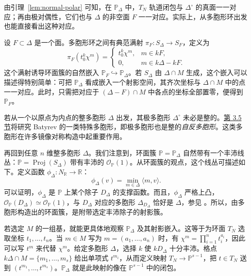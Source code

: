 由引理~\ref{lem:normal-polar} 可知，在 $\mathbb P_\Delta$ 中，$T_N$ 轨道闭包与 $\Delta^\circ$ 的真面一一对应；再由极对偶性，它们也与 $\Delta$ 的非空面 $F$ 一一对应。实际上，从多胞形环出发也能直接看出这种对应。

设 $F\subset\Delta$ 是一个面。多胞形环之间有典范满射 $\pi_F:S_\Delta\to S_F$，定义为
\[
\pi_F(t_0^k\chi^m)=
\begin{cases}
t_0^k\chi^m,&m\in kF,\\
0,&m\in k\Delta-kF.
\end{cases}
\]
这个满射诱导环面簇的自然嵌入 $\mathbb P_F\hookrightarrow\mathbb P_\Delta$。若 $S_\Delta$ 由 $\Delta\cap M$ 生成，这个嵌入可以描述得特别简单：可把 $\mathbb P_\Delta$ 看成嵌入一个射影空间，其齐次坐标与 $\Delta\cap M$ 中的点一一对应。此时，只需把对应于 $(\Delta-F)\cap M$ 中各点的坐标全部置零，便得到 $\mathbb P_F$。

若从一个以原点为内点的整多胞形 $\Delta$ 出发，其极多胞形 $\Delta^\circ$ 未必是整的。\hyperref[sec:fano-reflexive]{第 3.5 节}将研究 Batyrev 的一类特殊多胞形，即极多胞形也是整的\emph{自反多胞形}。这类多胞形在许多镜像对称构造中起重要作用。

再回到任意 $n$ 维整多胞形 $\Delta$。我们注意到，环面簇 $\mathbb P=\mathbb P_\Delta$ 自然带有一个丰沛线丛：$\mathbb P=\operatorname{Proj}(S_\Delta)$ 带有丰沛的 $\mathcal O_{\mathbb P}(1)$。从环面簇的观点，这个线丛可描述如下。定义函数 $\phi_\Delta:N_{\mathbb R}\to\mathbb R$：
\[
\phi_\Delta(v)=\min_{m\in\Delta}\langle m,v\rangle .
\]
可以证明，$\phi_\Delta$ 是 $\mathbb P$ 上某个除子 $D_\Delta$ 的支撑函数。而且，$\phi_\Delta$ 严格上凸，$\mathcal O_{\mathbb P}(D_\Delta)\simeq\mathcal O_{\mathbb P}(1)$，与 $D_\Delta$ 对应的多胞形 $\Delta_{D_\Delta}$ 恰好是 $\Delta$，参见 。所以，由多胞形构造出的环面簇，是附带选定丰沛除子的射影簇。

若选定 $M$ 的一组基，就能更具体地观察 $\mathbb P_\Delta$ 及其射影嵌入。这等于为环面 $T_N$ 选取坐标 $t_1,\ldots,t_n$。当 $m\in M$ 写为 $m=(a_1,\ldots,a_n)$ 时，有 $\chi^m=\prod_{i=1}^{n}t_i^{a_i}$，因此可以写 $t^m$ 来代替 $\chi^m$。给定多胞形 $\Delta$，选择 $k$ 使 $kD_\Delta$ 十分丰沛。格点 $k\Delta\cap M=\{m_1,\ldots,m_s\}$ 给出单项式 $t^{m_i}$，从而定义映射 $T_N\to\mathbb P^{s-1}$，把 $t\in T_N$ 送到 $(t^{m_1},\ldots,t^{m_s})$。$\mathbb P_\Delta$ 就是此映射的像在 $\mathbb P^{s-1}$ 中的闭包。

